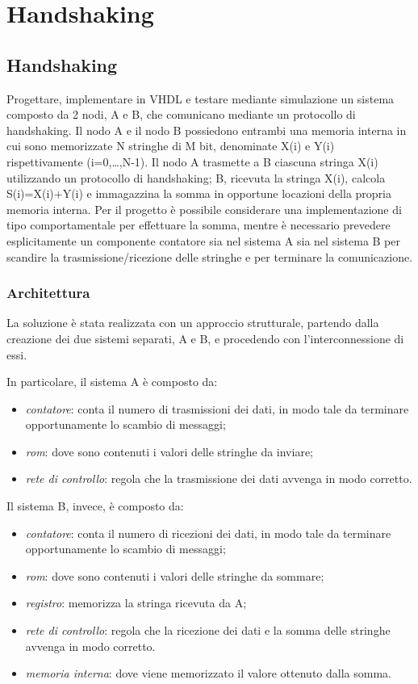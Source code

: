 \chapter{Handshaking}

\section{Handshaking}

Progettare, implementare in VHDL e testare mediante simulazione un sistema composto da 2 nodi, A e B, che comunicano mediante un protocollo di handshaking. Il nodo A e il nodo B possiedono entrambi una memoria interna in cui sono memorizzate N stringhe di M bit, denominate X(i) e Y(i) rispettivamente (i=0,…,N-1). Il nodo A trasmette a B ciascuna stringa X(i) utilizzando un protocollo di handshaking; B, ricevuta la stringa X(i), calcola S(i)=X(i)+Y(i) e immagazzina la somma in opportune locazioni della propria memoria interna.
Per il progetto è possibile considerare una implementazione di tipo comportamentale per effettuare la somma, mentre è necessario prevedere esplicitamente un componente contatore sia nel sistema A sia nel sistema B per scandire la trasmissione/ricezione delle stringhe e per terminare la comunicazione.

\subsection{Architettura}

La soluzione è stata realizzata con un approccio strutturale, partendo dalla creazione dei due sistemi separati, A e B, e procedendo con l'interconnessione di essi. 

In particolare, il sistema A è composto da:
\begin{itemize}
    \item \textit{contatore}: conta il numero di trasmissioni dei dati, in modo tale da terminare opportunamente lo scambio di messaggi;
    \item \textit{rom}: dove sono contenuti i valori delle stringhe da inviare;
    \item \textit{rete di controllo}: regola che la trasmissione dei dati avvenga in modo corretto.
\end{itemize}

Il sistema B, invece, è composto da:
\begin{itemize}
    \item \textit{contatore}: conta il numero di ricezioni dei dati, in modo tale da terminare opportunamente lo scambio di messaggi;
    \item \textit{rom}: dove sono contenuti i valori delle stringhe da sommare;
    \item \textit{registro}: memorizza la stringa ricevuta da A;
    \item \textit{rete di controllo}: regola che la ricezione dei dati e la somma delle stringhe avvenga in modo corretto.
    \item \textit{memoria interna}: dove viene memorizzato il valore ottenuto dalla somma.
\end{itemize}

